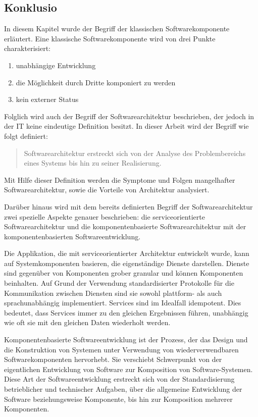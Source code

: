 \subsection{Konklusio}
\label{sec:2_Konklusion}

In diesem Kapitel wurde der Begriff der klassischen Softwarekomponente erläutert. Eine klassische Softwarekomponente wird von drei Punkte charakterisiert:
\begin{enumerate}
\item unabhängige Entwicklung
\item die Möglichkeit durch Dritte komponiert zu werden
\item kein externer Status
\end{enumerate}

Folglich wird auch der Begriff der Softwarearchitektur beschrieben, der jedoch in der IT keine eindeutige Definition besitzt. In dieser Arbeit wird der Begriff wie folgt definiert:
\begin{quote}
Softwarearchitektur erstreckt sich von der Analyse des Problembereichs eines Systems bis hin zu seiner Realisierung.
\end{quote}

Mit Hilfe dieser Definition werden die Symptome und Folgen mangelhafter Softwarearchitektur, sowie die Vorteile von Architektur analysiert.

Darüber hinaus wird mit dem bereits definierten Begriff der Softwarearchitektur zwei spezielle Aspekte genauer beschrieben: die serviceorientierte Softwarearchitektur und die komponentenbasierte Softwarearchitektur mit der komponentenbasierten Softwareentwicklung.

Die Applikation, die mit serviceorientierter Architektur entwickelt wurde, kann auf Systemkomponenten basieren, die eigenständige Dienste darstellen. Dienste sind gegenüber von Komponenten grober granular und können Komponenten beinhalten. Auf Grund der Verwendung standardisierter Protokolle für die Kommunikation zwischen Diensten sind sie sowohl plattform- als auch sprachunabhängig implementiert. Services sind im Idealfall idempotent. Dies bedeutet, dass Services immer zu den gleichen Ergebnissen führen, unabhängig wie oft sie mit den gleichen Daten wiederholt werden.

Komponentenbasierte Softwareentwicklung ist der Prozess, der das Design und die Konstruktion von Systemen unter Verwendung von wiederverwendbaren Softwarekomponenten hervorhebt. Sie verschiebt Schwerpunkt von der eigentlichen Entwicklung von Software zur Komposition von Software-Systemen. Diese Art der Softwareentwicklung erstreckt sich von der Standardisierung betrieblicher und technischer Aufgaben, über die allgemeine Entwicklung der Software beziehungsweise Komponente, bis hin zur Komposition mehrerer Komponenten.

